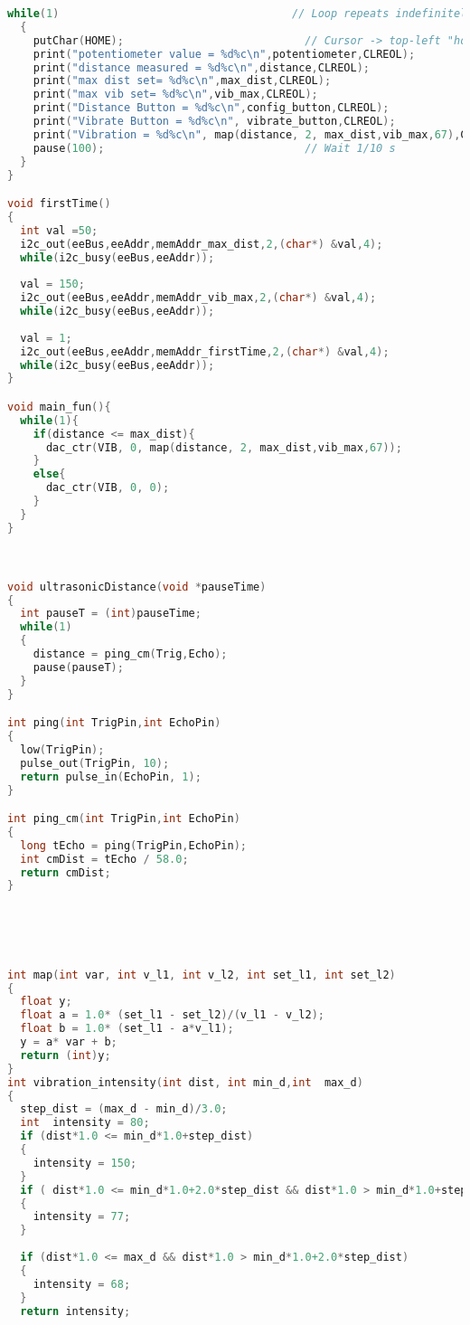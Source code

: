\documentclass[twoside,11pt,letter]{article}
\begin{document}
\begin{lstlisting}[language=C]
  while(1)                                    // Loop repeats indefinitely
  {
    putChar(HOME);                            // Cursor -> top-left "home"  
    print("potentiometer value = %d%c\n",potentiometer,CLREOL);
    print("distance measured = %d%c\n",distance,CLREOL);
    print("max dist set= %d%c\n",max_dist,CLREOL);
    print("max vib set= %d%c\n",vib_max,CLREOL);
    print("Distance Button = %d%c\n",config_button,CLREOL);
    print("Vibrate Button = %d%c\n", vibrate_button,CLREOL);
    print("Vibration = %d%c\n", map(distance, 2, max_dist,vib_max,67),CLREOL);
    pause(100);                               // Wait 1/10 s
  }  
}

void firstTime()
{
  int val =50;
  i2c_out(eeBus,eeAddr,memAddr_max_dist,2,(char*) &val,4);
  while(i2c_busy(eeBus,eeAddr));
  
  val = 150;
  i2c_out(eeBus,eeAddr,memAddr_vib_max,2,(char*) &val,4);
  while(i2c_busy(eeBus,eeAddr));
  
  val = 1;
  i2c_out(eeBus,eeAddr,memAddr_firstTime,2,(char*) &val,4);
  while(i2c_busy(eeBus,eeAddr));
}  

void main_fun(){
  while(1){
    if(distance <= max_dist){
      dac_ctr(VIB, 0, map(distance, 2, max_dist,vib_max,67));
    }
    else{
      dac_ctr(VIB, 0, 0);      
    }
  }          
}  



void ultrasonicDistance(void *pauseTime)
{
  int pauseT = (int)pauseTime;
  while(1)
  {
    distance = ping_cm(Trig,Echo);
    pause(pauseT);
  }    
}   

int ping(int TrigPin,int EchoPin)
{
  low(TrigPin);
  pulse_out(TrigPin, 10);
  return pulse_in(EchoPin, 1);
}

int ping_cm(int TrigPin,int EchoPin)
{
  long tEcho = ping(TrigPin,EchoPin);
  int cmDist = tEcho / 58.0;
  return cmDist;
}





int map(int var, int v_l1, int v_l2, int set_l1, int set_l2)
{
  float y;
  float a = 1.0* (set_l1 - set_l2)/(v_l1 - v_l2);
  float b = 1.0* (set_l1 - a*v_l1);
  y = a* var + b;
  return (int)y;
}  
int vibration_intensity(int dist, int min_d,int  max_d)
{
  step_dist = (max_d - min_d)/3.0;
  int  intensity = 80;
  if (dist*1.0 <= min_d*1.0+step_dist)
  {
    intensity = 150;
  }
  if ( dist*1.0 <= min_d*1.0+2.0*step_dist && dist*1.0 > min_d*1.0+step_dist)
  {
    intensity = 77;
  }        
    
  if (dist*1.0 <= max_d && dist*1.0 > min_d*1.0+2.0*step_dist)
  {
    intensity = 68;
  }  
  return intensity; 
  

\end{lstlisting}
\end{document}
